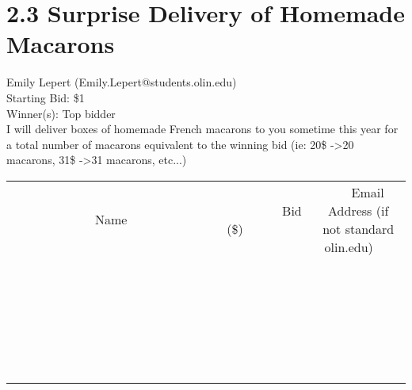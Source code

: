 \documentclass[11pt]{article}
\begin{document}
\section*{2.3 Surprise Delivery of Homemade Macarons}
Emily Lepert (Emily.Lepert@students.olin.edu) \\
Starting Bid: \$1 \\
Winner(s): 
Top bidder \\
I will deliver boxes of homemade French macarons to you sometime this year for a total number of macarons equivalent to the winning bid (ie: 20\$ -\textgreater  20 macarons, 31\$ -\textgreater  31 macarons, etc...) \\[6ex]
\begin{tabular}{c c c}
~~~~~~~~~~~~~Name~~~~~~~~~~~~~ & ~~~~~~~~~Bid (\$)~~~~~~~~~ & ~~~Email Address (if not standard olin.edu)~~~ \\
 & & \\
\hline
 & & \\
\hline
 & & \\
\hline
 & & \\
\hline
 & & \\
\hline
 & & \\
\hline
 & & \\
\hline
 & & \\
\hline
 & & \\
\hline
 & & \\
\hline
 & & \\
\hline
 & & \\
\hline
 & & \\
\hline
 & & \\
\hline
 & & \\
\hline
 & & \\
\hline
 & & \\
\hline
 & & \\
\hline
 & & \\
\hline
 & & \\
\hline
 & & \\
\hline
 & & \\
\hline
 & & \\
\hline
 & & \\
\hline
 & & \\
\hline
 & & \\
\hline
\end{tabular}
\clearpage
\end{document}

